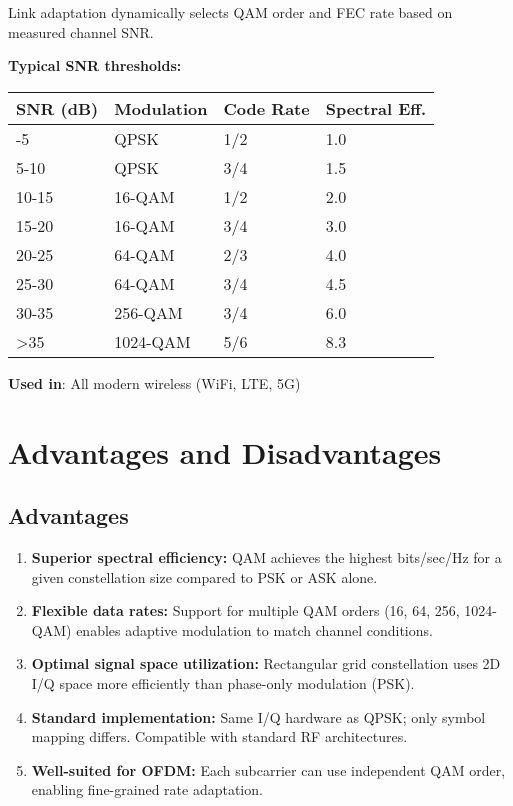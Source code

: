 Link adaptation dynamically selects QAM order and FEC rate based on measured channel SNR.

\textbf{Typical SNR thresholds:}

{\def\LTcaptype{} %
\begin{longtable}[]{@{}llll@{}}
\toprule\noalign{}
SNR (dB) & Modulation & Code Rate & Spectral Eff. \\
\midrule\noalign{}
\endhead
\bottomrule\noalign{}
\endlastfoot
0-5 & QPSK & 1/2 & 1.0 \\
5-10 & QPSK & 3/4 & 1.5 \\
10-15 & 16-QAM & 1/2 & 2.0 \\
15-20 & 16-QAM & 3/4 & 3.0 \\
20-25 & 64-QAM & 2/3 & 4.0 \\
25-30 & 64-QAM & 3/4 & 4.5 \\
30-35 & 256-QAM & 3/4 & 6.0 \\
\textgreater35 & 1024-QAM & 5/6 & 8.3 \\
\end{longtable}
}

\textbf{Used in}: All modern wireless (WiFi, LTE, 5G)

\section{Advantages and Disadvantages}

\subsection*{Advantages}

\begin{enumerate}
\item \textbf{Superior spectral efficiency:} QAM achieves the highest bits/sec/Hz for a given constellation size compared to PSK or ASK alone.

\item \textbf{Flexible data rates:} Support for multiple QAM orders (16, 64, 256, 1024-QAM) enables adaptive modulation to match channel conditions.

\item \textbf{Optimal signal space utilization:} Rectangular grid constellation uses 2D I/Q space more efficiently than phase-only modulation (PSK).

\item \textbf{Standard implementation:} Same I/Q hardware as QPSK; only symbol mapping differs. Compatible with standard RF architectures.

\item \textbf{Well-suited for OFDM:} Each subcarrier can use independent QAM order, enabling fine-grained rate adaptation.
\end{enumerate}

